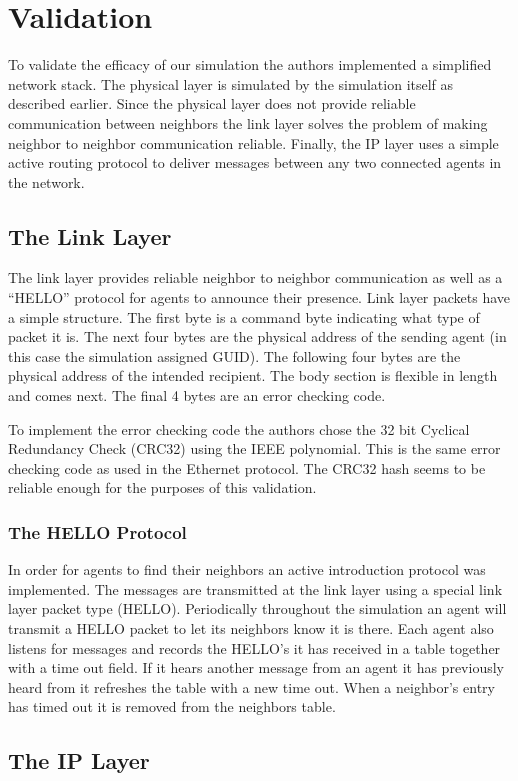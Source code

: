 \section{Validation}

To validate the efficacy of our simulation the authors implemented a simplified network stack. The
physical layer is simulated by the simulation itself as described earlier. Since the physical layer
does not provide reliable communication between neighbors the link layer solves the problem of
making neighbor to neighbor communication reliable. Finally, the IP layer uses a simple active
routing protocol to deliver messages between any two connected agents in the network.

\subsection{The Link Layer}

The link layer provides reliable neighbor to neighbor communication as well as a ``HELLO'' protocol
for agents to announce their presence. Link layer packets have a simple structure. The first byte is
a command byte indicating what type of packet it is. The next four bytes are the physical address of
the sending agent (in this case the simulation assigned GUID). The following four bytes are the
physical address of the intended recipient. The body section is flexible in length and comes next.
The final 4 bytes are an error checking code.

To implement the error checking code the authors chose the 32 bit Cyclical Redundancy Check (CRC32)
using the IEEE polynomial. This is the same error checking code as used in the Ethernet protocol.
The CRC32 hash seems to be reliable enough for the purposes of this validation. 

\subsubsection{The HELLO Protocol}

In order for agents to find their neighbors an active introduction protocol was implemented. The
messages are transmitted at the link layer using a special link layer packet type (HELLO).
Periodically throughout the simulation an agent will transmit a HELLO packet to let its neighbors
know it is there. Each agent also listens for messages and records the HELLO's it has received in a
table together with a time out field. If it hears another message from an agent it has previously
heard from it refreshes the table with a new time out. When a neighbor's entry has timed out it is
removed from the neighbors table.

\subsection{The IP Layer}



